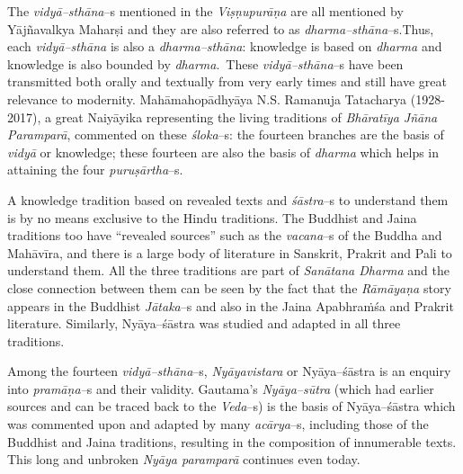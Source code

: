 The \textit{vidyā–sthāna}–s mentioned in the \textit{Viṣṇupurāṇa} are all mentioned by Yājñavalkya Maharṣi and they are also referred to as \textit{dharma–sthāna}–s.\break Thus, each \textit{vidyā–sthāna} is also a \textit{dharma–sthāna}: knowledge is based on \textit{dharma} and knowledge is also bounded by \textit{dharma}.~These \textit{vidyā–sthāna}–s have been transmitted both orally and textually from very early times and still have great relevance to modernity. Mahāmahopādhyāya N.S. Ramanuja Tatacharya (1928-2017), a great Naiyāyika representing the living traditions of \textit{Bhāratīya Jñāna Paramparā}, commented on these \textit{śloka}–s: the fourteen branches are the basis of\textit{ vidyā }or knowledge; these fourteen are also the basis of \textit{dharma }which helps in attaining the four \textit{puruṣārtha}–s.

A knowledge tradition based on revealed texts and \textit{śāstra}–s to understand them is by no means exclusive to the Hindu traditions. The Buddhist and Jaina traditions too have “revealed sources” such as the \textit{vacana}–s of the Buddha and Mahāvīra, and there is a large body of literature in Sanskrit, Prakrit and Pali to understand them. All the three traditions are part of \textit{Sanātana Dharma} and the close connection between them can be seen by the fact that the \textit{Rāmāyaṇa} story appears in the Buddhist \textit{Jātaka}–s and also in the Jaina Apabhraṁśa and Prakrit literature. Similarly, Nyāya–śāstra was studied and adapted in all three traditions.

Among the fourteen \textit{vidyā–sthāna}–s, \textit{Nyāyavistara} or Nyāya–śāstra is an enquiry into \textit{pramāṇa–}s and their validity. Gautama’s \textit{Nyāya–sūtra} (which had earlier sources and can be traced back to the \textit{Veda}–s) is the basis of Nyāya–śāstra which was commented upon and adapted by many \textit{acārya}–s, including those of the Buddhist and Jaina traditions, resulting in the composition of innumerable texts. This long and unbroken \textit{Nyāya paramparā} continues even today.


